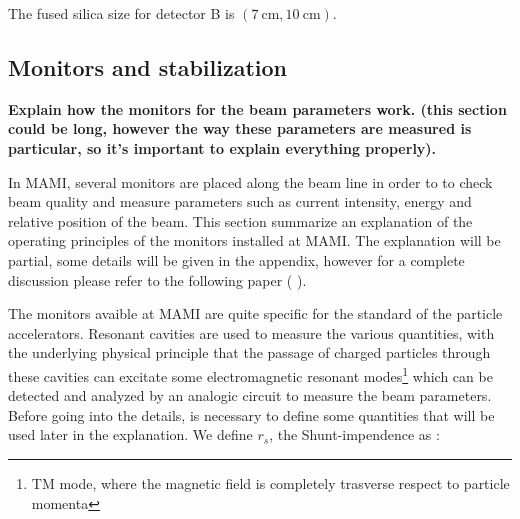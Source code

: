 \begin{figure}[hbtp]
\centering
{} \quad
{} \quad
	\label{fig:Detectors}
\end{figure}

The fused silica size for detector B is $(\SI{7}{\centi \meter},\SI{10}{\centi \meter})$. 

\subsection{Monitors and stabilization}
{\bfseries Explain how the monitors for the beam parameters work. (this section could be long, however the way these parameters are measured is particular, so it's important to explain everything properly).}

In MAMI, several monitors are placed along the beam line in order to to check beam quality and measure parameters such as current intensity, energy and relative position of the beam. This section summarize an explanation of the operating principles of the monitors installed at MAMI. The explanation will be partial, some details will be given in the appendix, however for a complete discussion please refer to the following paper ( \cite{M_Dehn}).

The monitors avaible at MAMI are quite specific for the standard of the particle accelerators. Resonant cavities are used to measure the various quantities, with the underlying physical principle that the passage of charged particles through these cavities can excitate some electromagnetic resonant modes\footnote{TM mode, where the magnetic field is completely trasverse respect to particle momenta} which can be detected and analyzed by an analogic circuit to measure the beam parameters.
Before going into the details, is necessary to define some quantities that will be used later in the explanation. We define $r_{s}$, the Shunt-impendence as :

